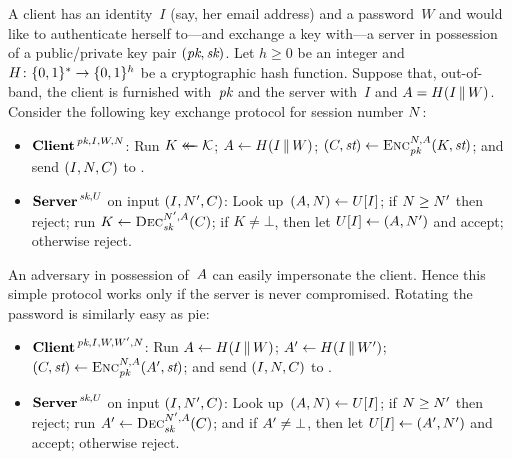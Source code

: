 %
%
%
%
\label{sec:ake}
A client has an identity~$I$ (say, her email address) and a password~$W$ and
would like to authenticate herself to---and exchange a key with---a server in
possession of a public/private key pair $(\textit{pk},\textit{sk})$.
%
Let $h\geq0$ be an integer and $H \colon \{0,1\}^* \to \{0,1\}^h$ be a cryptographic
hash function. Suppose that, out-of-band, the client is furnished with~$\textit{pk}$ and
the server with~$I$ and $A= H(I \, \| \, W)$.
%
Consider the following key exchange protocol for session number $N$:
\begin{itemize}
  \item $\textbf{Client}^{\,\textit{pk},I,W,N}$:
    Run $K \mathrel{\leftarrow\mkern-14mu\leftarrow} \mathcal{K}$;
    $A \gets H(I \, \| \, W)$;
    $(C, \textit{st}) \gets \textsc{Enc}_{\textit{pk}}^{N,A}(K, \textit{st})$; and
    send $(I, N, C)$ to \srv.

  \item $\textbf{Server}^{\,\textit{sk},U}$ on input $(I, N', C)$:
    Look up~$(A, N) \gets U[I]$;
    if $N \geq N'$ then reject;
    run $K \gets \textsc{Dec}_{\textit{sk}}^{N',A}(C)$;
    if $K \ne \bot$, then let $U[I] \gets (A, N')$ and accept; otherwise reject.
\end{itemize}
%
An adversary in possession of~$A$ can easily impersonate the client. Hence
this simple protocol works only if the server is never compromised.
%
%
Rotating the password is similarly easy as pie:
%
\begin{itemize}
  \item $\textbf{Client}^{\,\textit{pk},I,W,W',N}$:
    Run $A \gets H(I \, \| \, W)$; $A' \gets H(I \, \| \, W')$;
    $(C, \textit{st}) \gets \textsc{Enc}_{\textit{pk}}^{N,A}(A', \textit{st})$; and
    send $(I, N, C)$ to \srv.

  \item $\textbf{Server}^{\,\textit{sk},U}$ on input $(I, N', C)$:
    Look up~$(A, N) \gets U[I]$;
    if $N \geq N'$ then reject;
    run $A' \gets \textsc{Dec}_{\textit{sk}}^{N',A}(C)$; and
    if $A' \ne \bot$, then let $U[I] \gets (A', N')$ and accept;
    otherwise reject.
\end{itemize}
